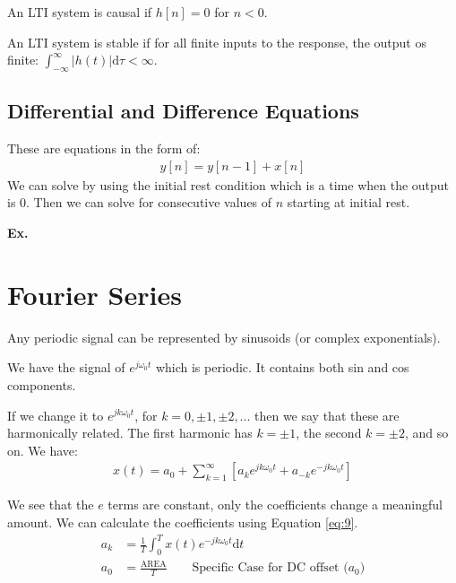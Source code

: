 \documentclass[12pt,letterpaper]{article} \usepackage{amsmath} \usepackage{graphicx} \usepackage[margin=1in]{geometry} \usepackage{longtable}  \usepackage{amssymb}
\begin{document}
	An LTI system is causal if $h[n] = 0$ for $n < 0$.
	
	An LTI system is stable if for all finite inputs to the response, the output os finite: $\int^{\infty}_{-\infty} |h(t)|\mathrm d \tau < \infty$.
	\subsection{Differential and Difference Equations}
	These are equations in the form of:
	\begin{align*}
		y[n] = y[n-1] + x[n]
	\end{align*}
	We can solve by using the initial rest condition which is a time when the output is 0. Then we can solve for consecutive values of $n$ starting at initial rest. 
	
	\begin{mdframed}
		\textbf{Ex. }
	\end{mdframed}
	\section{Fourier Series}
	Any periodic signal can be represented by sinusoids (or complex exponentials).
	
	We have the signal of $e^{j\omega_0t}$ which is periodic. It contains both sin and cos components. 
	
	If we change it to $e^{jk\omega_0 t}$, for $k=0, \pm1, \pm2, ...$ then we say that these are harmonically related. The first harmonic has $k=\pm1$, the second $k=\pm2$, and so on. We have:
	\begin{align}
		x(t) = a_0 + \sum^{\infty}_{k=1} \left[a_k e^{jk\omega_0t} + a_{-k}e^{-jk\omega_0t}\right]
	\end{align}
	
	We see that the $e$ terms are constant, only the coefficients change a meaningful amount. We can calculate the coefficients using Equation \ref{eq:9}.
	\begin{align}
		a_k &= \frac{1}{T}\int^T_0 x(t)e^{-jk\omega_0 t}\mathrm d t\label{eq:9}\\
		a_0 &= \frac{\text{AREA}}{T} \qquad \text{Specific Case for DC offset ($a_0$)}
	\end{align}
	
\end{document}
